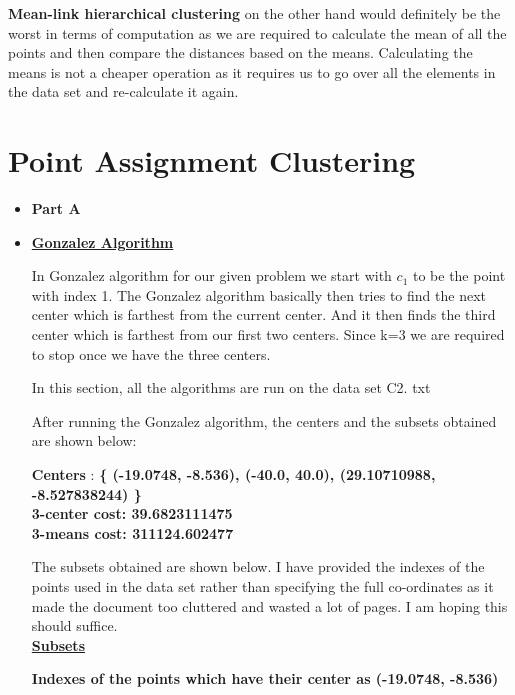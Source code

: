 \documentclass[11pt]{article}
\begin{document}
\begin{itemize}
	\textbf{Mean-link hierarchical clustering} on the other hand would definitely be the worst in terms of computation as we are required to calculate the mean of all the points and then compare the distances based on the means. Calculating the means is not a cheaper operation as it requires us to go over all the elements in the data set and re-calculate it again.
	
	
	\end{itemize}




	
\section{Point Assignment Clustering}

\begin{itemize}
	
\item[] \textbf{ Part A}
	
\item[] \underline{\textbf{Gonzalez Algorithm}}

In Gonzalez algorithm for our given problem we start with $c_1$ to be the point with index 1. The Gonzalez algorithm basically then tries to find the next center which is farthest from the current center. And it then finds the third center which is farthest from our first two centers. Since k=3 we are required to stop once we have the three centers.

In this section, all the algorithms are run on the data set C2. txt

After running the Gonzalez algorithm, the centers and the subsets obtained are shown below:


 \textbf{Centers} :  \textbf{\{  (-19.0748, -8.536), (-40.0, 40.0), (29.10710988, -8.527838244)   \}}\\
\textbf{ 3-center cost:  39.6823111475 }\\
\textbf{ 3-means cost:  311124.602477}\\
\pagebreak


The subsets obtained are shown below. I have provided the indexes of the points used in the data set rather than specifying the full co-ordinates as it made the document too cluttered and wasted a lot of pages. I am hoping this should suffice. \\

\underline{\textbf{Subsets}}

\textbf{Indexes of the points which have their center as (-19.0748, -8.536)}


\end{itemize}
\end{document}
